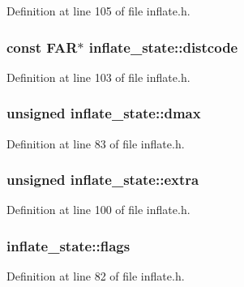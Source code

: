 Definition at line 105 of file inflate.\-h.

\hypertarget{structinflate__state_a19f7ae2fe2682cb1163860f6991a107f}{
\subsubsection[{distcode}]{ const F\-A\-R$\ast$ inflate\-\_\-state\-::distcode}}\label{structinflate__state_a19f7ae2fe2682cb1163860f6991a107f}


Definition at line 103 of file inflate.\-h.

\hypertarget{structinflate__state_ae3d433011714e673b22e82156acc4416}{
\subsubsection[{dmax}]{\setlength{\rightskip}{0pt plus 5cm}unsigned inflate\-\_\-state\-::dmax}}\label{structinflate__state_ae3d433011714e673b22e82156acc4416}


Definition at line 83 of file inflate.\-h.

\hypertarget{structinflate__state_a5b7b0be77d61e8468716c7f265dd0780}{
\subsubsection[{extra}]{\setlength{\rightskip}{0pt plus 5cm}unsigned inflate\-\_\-state\-::extra}}\label{structinflate__state_a5b7b0be77d61e8468716c7f265dd0780}


Definition at line 100 of file inflate.\-h.

\hypertarget{structinflate__state_a9dcf6151443750d75b2283d0a3e62c39}{
\subsubsection[{flags}]{ inflate\-\_\-state\-::flags}}\label{structinflate__state_a9dcf6151443750d75b2283d0a3e62c39}


Definition at line 82 of file inflate.\-h.

